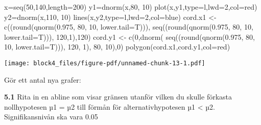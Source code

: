 \documentclass[
  letterpaper,
  DIV=11,
  numbers=noendperiod]{scrartcl}
\newenvironment{Shaded}{\begin{snugshade}}{\end{snugshade}}
\newcommand{\AttributeTok}[1]{\textcolor[rgb]{0.40,0.45,0.13}{#1}}
\newcommand{\DecValTok}[1]{\textcolor[rgb]{0.68,0.00,0.00}{#1}}
\newcommand{\FloatTok}[1]{\textcolor[rgb]{0.68,0.00,0.00}{#1}}
\newcommand{\FunctionTok}[1]{\textcolor[rgb]{0.28,0.35,0.67}{#1}}
\newcommand{\NormalTok}[1]{\textcolor[rgb]{0.00,0.23,0.31}{#1}}
\newcommand{\OtherTok}[1]{\textcolor[rgb]{0.00,0.23,0.31}{#1}}
\newcommand{\StringTok}[1]{\textcolor[rgb]{0.13,0.47,0.30}{#1}}
\begin{document}
\begin{Shaded}
\begin{Highlighting}[]
\NormalTok{x}\OtherTok{=}\FunctionTok{seq}\NormalTok{(}\DecValTok{50}\NormalTok{,}\DecValTok{140}\NormalTok{,}\AttributeTok{length=}\DecValTok{200}\NormalTok{)}
\NormalTok{y1}\OtherTok{=}\FunctionTok{dnorm}\NormalTok{(x,}\DecValTok{80}\NormalTok{, }\DecValTok{10}\NormalTok{)}
\FunctionTok{plot}\NormalTok{(x,y1,}\AttributeTok{type=}\StringTok{\textquotesingle{}l\textquotesingle{}}\NormalTok{,}\AttributeTok{lwd=}\DecValTok{2}\NormalTok{,}\AttributeTok{col=}\StringTok{\textquotesingle{}red\textquotesingle{}}\NormalTok{)}
\NormalTok{y2}\OtherTok{=}\FunctionTok{dnorm}\NormalTok{(x,}\DecValTok{110}\NormalTok{, }\DecValTok{10}\NormalTok{)}
\FunctionTok{lines}\NormalTok{(x,y2,}\AttributeTok{type=}\StringTok{\textquotesingle{}l\textquotesingle{}}\NormalTok{,}\AttributeTok{lwd=}\DecValTok{2}\NormalTok{,}\AttributeTok{col=}\StringTok{\textquotesingle{}blue\textquotesingle{}}\NormalTok{)}
\NormalTok{cord.x1 }\OtherTok{\textless{}{-}} \FunctionTok{c}\NormalTok{((}\FunctionTok{round}\NormalTok{(}\FunctionTok{qnorm}\NormalTok{(}\FloatTok{0.975}\NormalTok{, }\DecValTok{80}\NormalTok{, }\DecValTok{10}\NormalTok{, }\AttributeTok{lower.tail=}\NormalTok{T))),}
\FunctionTok{seq}\NormalTok{((}\FunctionTok{round}\NormalTok{(}\FunctionTok{qnorm}\NormalTok{(}\FloatTok{0.975}\NormalTok{, }\DecValTok{80}\NormalTok{, }\DecValTok{10}\NormalTok{, }\AttributeTok{lower.tail=}\NormalTok{T))), }\DecValTok{120}\NormalTok{,}\DecValTok{1}\NormalTok{),}\DecValTok{120}\NormalTok{)}
\NormalTok{cord.y1 }\OtherTok{\textless{}{-}} \FunctionTok{c}\NormalTok{(}\DecValTok{0}\NormalTok{,}\FunctionTok{dnorm}\NormalTok{(}
  \FunctionTok{seq}\NormalTok{((}\FunctionTok{round}\NormalTok{(}\FunctionTok{qnorm}\NormalTok{(}\FloatTok{0.975}\NormalTok{, }\DecValTok{80}\NormalTok{, }\DecValTok{10}\NormalTok{, }\AttributeTok{lower.tail=}\NormalTok{T))), }\DecValTok{120}\NormalTok{, }\DecValTok{1}\NormalTok{), }\DecValTok{80}\NormalTok{, }\DecValTok{10}\NormalTok{),}\DecValTok{0}\NormalTok{)}
\FunctionTok{polygon}\NormalTok{(cord.x1,cord.y1,}\AttributeTok{col=}\StringTok{\textquotesingle{}red\textquotesingle{}}\NormalTok{)}
\end{Highlighting}
\end{Shaded}

\texttt{[image: block4\_files/figure-pdf/unnamed-chunk-13-1.pdf]}

Gör ett antal nya grafer:

\textbf{5.1} Rita in en abline som visar gränsen utanför vilken du
skulle förkasta nollhypotesen µ1 = µ2 till förmån för
alternativhypotesen µ1 \textless{} µ2. Signifikansnivån ska vara 0.05
\end{document}
